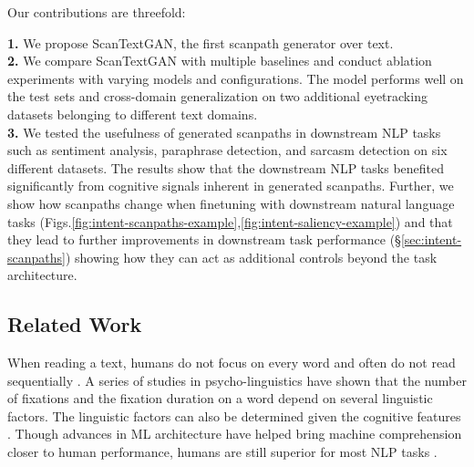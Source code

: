 Our contributions are threefold:

\noindent \textbf{1.} We propose ScanTextGAN, the first scanpath generator over text. \\
\textbf{2.} We compare ScanTextGAN with multiple baselines and conduct ablation experiments with varying models and configurations. The model performs well on the test sets and cross-domain generalization on two additional eyetracking datasets belonging to different text domains.\\
\textbf{3.} We tested the usefulness of generated scanpaths in downstream NLP tasks such as sentiment analysis, paraphrase detection, and sarcasm detection on six different datasets. The results show that the downstream NLP tasks benefited significantly from cognitive signals inherent in generated scanpaths. Further, we show how scanpaths change when finetuning with downstream natural language tasks (Figs.\ref{fig:intent-scanpaths-example},\ref{fig:intent-saliency-example}) and that they lead to further improvements in downstream task performance (\S\ref{sec:intent-scanpaths}) showing how they can act as additional controls beyond the task architecture.






\subsection{Related Work}
\label{sec:RelatedWork}

When reading a text, humans do not focus on every word and often do not read sequentially \cite{Just1980}. A series of studies in psycho-linguistics have shown that the number of fixations and the fixation duration on a word depend on several linguistic factors. The linguistic factors can also be determined given the cognitive features \cite{clifton2007eye, demberg2008data}.
Though advances in ML architecture have helped bring machine comprehension closer to human performance, humans are still superior for most NLP tasks \cite{blohm-etal-2018-comparing,xia-etal-2019-automatic}. 

